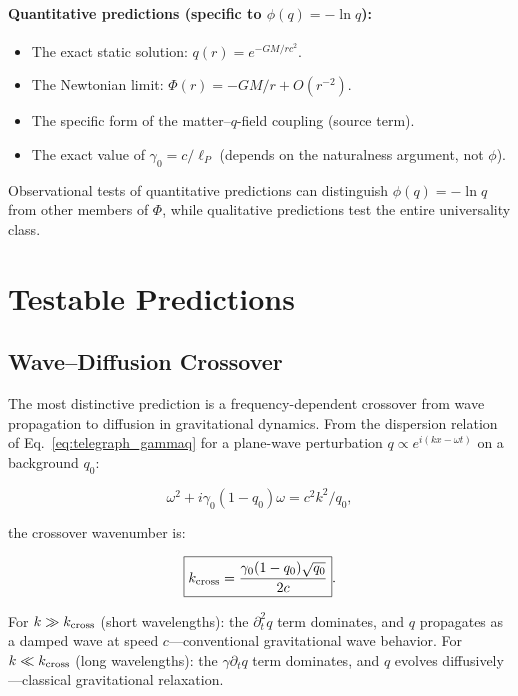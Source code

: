 \documentclass[aps,prd,twocolumn,showpacs,superscriptaddress,preprintnumbers]{revtex4-2}
\begin{document}
\paragraph{Quantitative predictions (specific to $\phi(q)=-\ln q$):}
\begin{itemize}
    \item The exact static solution: $q(r)=e^{-GM/rc^2}$.
    \item The Newtonian limit: $\Phi(r)=-GM/r + O(r^{-2})$.
    \item The specific form of the matter--$q$-field coupling (source term).
    \item The exact value of $\gamma_0=c/\ell_P$ (depends on the naturalness argument, not $\phi$).
\end{itemize}

Observational tests of quantitative predictions can distinguish $\phi(q)=-\ln q$ from other members of $\Phi$, while qualitative predictions test the entire universality class.

\section{Testable Predictions}
\label{sec:predictions}

\subsection{Wave--Diffusion Crossover}

The most distinctive prediction is a frequency-dependent crossover from wave propagation to diffusion in gravitational dynamics.
From the dispersion relation of Eq.~\eqref{eq:telegraph_gammaq} for a plane-wave perturbation $q\propto e^{i(kx-\omega t)}$ on a background $q_0$:

\begin{equation}
\omega^2 + i\gamma_0(1-q_0)\omega = c^2 k^2/q_0,
\label{eq:dispersion}
\end{equation}

the crossover wavenumber is:

\begin{equation}
\boxed{k_{\rm cross} = \frac{\gamma_0(1-q_0)\sqrt{q_0}}{2c}}.
\label{eq:kcross}
\end{equation}

For $k\gg k_{\rm cross}$ (short wavelengths): the $\partial_t^2 q$ term dominates, and $q$ propagates as a damped wave at speed $c$---conventional gravitational wave behavior.
For $k\ll k_{\rm cross}$ (long wavelengths): the $\gamma\partial_t q$ term dominates, and $q$ evolves diffusively---classical gravitational relaxation.
\end{document}
